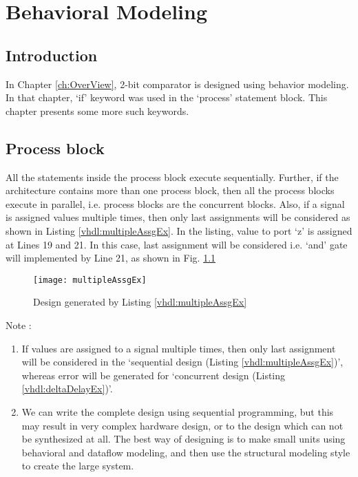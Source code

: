 \chapter{Behavioral Modeling} \label{ch:behavioralModeling}

\graphicspath{{Chapters/BehavioralModeling/Figures/}}


%

\section{Introduction}
In Chapter \ref{ch:OverView}, 2-bit comparator is designed using behavior modeling. In that chapter, `if' keyword was used in the `process' statement block. This chapter presents some more such keywords. 

\section{Process block}
All the statements inside the process block execute sequentially. Further, if the architecture contains more than one process block, then all the process blocks execute in parallel, i.e. process blocks are the concurrent blocks. Also, if a signal is assigned values multiple times, then only last assignments will be considered as shown in Listing \ref{vhdl:multipleAssgEx}. In the listing, value to port `z' is assigned at Lines 19 and 21. In this case, last assignment will be considered i.e. `and' gate will implemented by Line 21, as shown in Fig. \ref{fig:multipleAssgEx}



\begin{figure}
	\centering
	\texttt{[image: multipleAssgEx]}
	\caption{Design generated by Listing \ref{vhdl:multipleAssgEx}}
	\label{fig:multipleAssgEx}
\end{figure}

\begin{noNumBox}
	Note :
	\begin{enumerate}
		\item If values are assigned to a signal multiple times, then only last assignment will be considered in the `sequential design (Listing \ref{vhdl:multipleAssgEx})', whereas error will be generated for `concurrent design (Listing \ref{vhdl:deltaDelayEx})'. 
		\item We can write the complete design using sequential programming, but this may result in very complex hardware design, or to the design which can not be synthesized at all. The best way of designing is to make small units using behavioral and dataflow modeling, and then use the structural modeling style to create the large system. 
	\end{enumerate}
\end{noNumBox}

